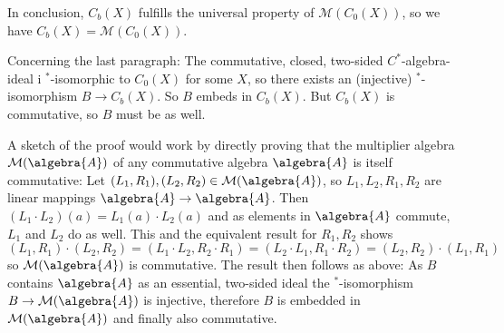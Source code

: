 \documentclass[a4paper]{article}
\begin{document}
 In conclusion, $C_b(X)$ fulfills the universal property of $\mathcal{M}(C_0(X))$, so we have $C_b(X) = \mathcal{M}(C_0(X))$.

 Concerning the last paragraph: The commutative, closed, two-sided $C^*$-algebra-ideal i $^*$-isomorphic to $C_0(X)$ for some $X$, so there exists an (injective) $^*$-isomorphism $B \to C_b(X)$.
 So $B$ embeds in $C_b(X)$. But $C_b(X)$ is commutative, so $B$ must be as well.

 A sketch of the proof would work by directly proving that the multiplier algebra $\mathcal{M}(\algebra{A})$ of any commutative algebra $\algebra{A}$ is itself commutative: Let $(L_1, R_1), (L_2, R_2) \in \mathcal{M}(\algebra{A})$, so $L_1, L_2, R_1, R_2$ are linear mappings $\algebra{A} \to \algebra{A}$.
 Then $(L_1 \cdot L_2)(a) = L_1(a) \cdot L_2(a)$ and as elements in $\algebra{A}$ commute, $L_1$ and $L_2$ do as well.
 This and the equivalent result for $R_1, R_2$ shows
 \begin{equation*}
    (L_1, R_1) \cdot (L_2, R_2) = (L_1 \cdot L_2, R_2 \cdot R_1) = (L_2 \cdot L_1, R_1 \cdot R_2) = (L_2, R_2) \cdot (L_1, R_1)
 \end{equation*}
 so $\mathcal{M}(\algebra{A})$ is commutative.
 The result then follows as above: As $B$ contains $\algebra{A}$ as an essential, two-sided ideal the $^*$-isomorphism $B \to \mathcal{M}(\algebra{A})$ is injective, therefore $B$ is embedded in $\mathcal{M}(\algebra{A})$ and finally also commutative.
\end{document}
